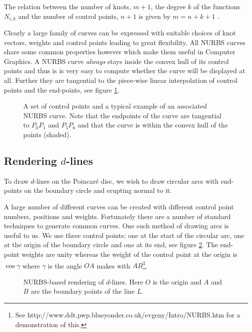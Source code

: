 The relation between the number of knots, $m+1$, the degree $k$ of 
the functions $N_{i,k}$ and the number of control points, $n+1$
is given by $m = n + k + 1$ \cite{peigl, rogers}.

Clearly a large family of curves can be expressed with suitable choices
of knot vectors, weights and control points leading to great flexibility.
All NURBS curves share some common properties however which make them
useful in Computer Graphics. A NURBS curve \emph{always} stays inside the
convex hull of its control points \cite{rogers} and thus is is very easy
to compute whether the curve will be displayed at all. Further they
are tangential to the piece-wise linear interpolation of control
points and the end-points, see figure \ref{fig:samplenurb}.

\begin{figure} \centering
{}
\caption{A set of control points and a typical example of an associated
NURBS curve. Note that the endpoints of the curve are tangential to
$P_0P_1$ and $P_5P_6$ and that the curve is within the convex hull
of the points (shaded).}
\label{fig:samplenurb}
\end{figure}

\subsection{Rendering $d$-lines}

To draw $d$-lines on the Poincar\'e disc, we wish to draw circular arcs
with end-points on the boundary circle and erupting normal to it.

A large number of different curves can be created with different control 
point numbers, positions and weights. Fortunately there are a number of
standard techniques to generate common curves. One such method of
drawing arcs is useful to us. We use three control
points; one at the start of the circular arc, one at the origin of the
boundary circle and one
at its end, see figure \ref{fig:nurbs}. 
The end-point weights are unity whereas the weight of the control
point at the origin is $\cos \gamma$ where $\gamma$ is the angle
$OA$ makes with $AB$\footnote{See http://www.ddt.pwp.blueyonder.co.uk/evgeny/Intro/NURBS.htm for a demonstration of this.}. 

\begin{figure} \centering
{}
\caption{NURBS-based rendering of $d$-lines. Here $O$ is the origin and
$A$ and $B$ are the boundary points of the line $L$.}
\label{fig:nurbs}
\end{figure}

